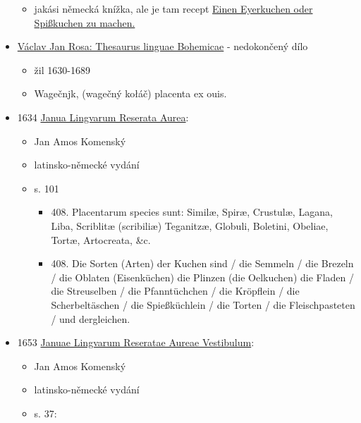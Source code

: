 \begin{itemize}
  \begin{itemize}
  \tightlist
  \item
    jakási německá knížka, ale je tam recept \hyperref[250605-2334]{Einen
    Eyerkuchen oder Spißkuchen zu machen.}
  \end{itemize}
\item
  \href{https://bara.ujc.cas.cz/slovniky/rosa/rosafst1480.html}{Václav
  Jan Rosa: Thesaurus linguae Bohemicae} - nedokončený dílo

  \begin{itemize}
  \tightlist
  \item
    žil 1630-1689
  \item
    Wagečnjk, (wagečný kołáč) placenta ex ouis.
  \end{itemize}
\item
  1634
  \href{https://ceskadigitalniknihovna.cz/uuid/uuid:e8cd9396-bbda-47f7-aac7-3f4a843367f6}{Janua
  Lingvarum Reserata Aurea}:

  \begin{itemize}
  \tightlist
  \item
    Jan Amos Komenský
  \item
    latinsko-německé vydání
  \item
    s. 101

    \begin{itemize}
    \tightlist
    \item
      408. Placentarum species sunt: Similæ, Spiræ, Crustulæ, Lagana,
      Liba, Scriblitæ (scribiliæ) Teganitzæ, Globuli, Boletini, Obeliae,
      Tortæ, Artocreata, \&c.
    \item
      408. Die Sorten (Arten) der Kuchen sind / die Semmeln / die
      Brezeln / die Oblaten (Eisenküchen) die Plinzen (die Oelkuchen)
      die Fladen / die Streuselben / die Pfanntüchchen / die Kröpflein /
      die Scherbeltäschen / die Spießküchlein / die Torten / die
      Fleischpasteten / und dergleichen.
    \end{itemize}
  \end{itemize}
\item
  1653
  \href{https://ceskadigitalniknihovna.cz/uuid/uuid:849c5567-5ea1-4490-835d-eca31d9b479c}{Januae
  Lingvarum Reseratae Aureae Vestibulum}:

  \begin{itemize}
  \tightlist
  \item
    Jan Amos Komenský
  \item
    latinsko-německé vydání
  \item
    s. 37:


\end{itemize}
\end{itemize}
